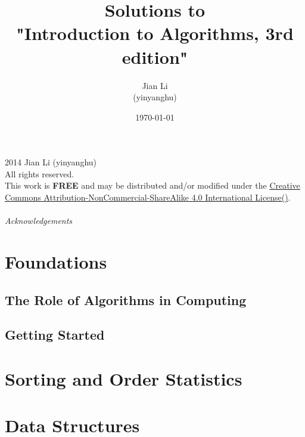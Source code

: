 \documentclass[11pt]{book}
\title{Solutions to\\"Introduction to Algorithms, 3rd edition"}
\author{Jian Li\\(yinyanghu)}
\date{\today}
\newcommand\yang[1]{\textbf{#1}}
\begin{document}
\frontmatter
\maketitle


\noindent\textcopyright{} 2014 Jian Li (yinyanghu)\\
All rights reserved.\\


\noindent This work is \yang{FREE} and may be distributed and/or modified under the \href{http://creativecommons.org/licenses/by-nc-sa/4.0/}{Creative Commons Attribution-NonCommercial-ShareAlike 4.0 International License(\ccbyncsa)}.\\

\paragraph{Acknowledgements}

\tableofcontents

\mainmatter

\part{Foundations}

\chapter{The Role of Algorithms in Computing}



\chapter{Getting Started}






\part{Sorting and Order Statistics}

\part{Data Structures}

\backmatter

\listoffigures
\listoftables
\end{document}
